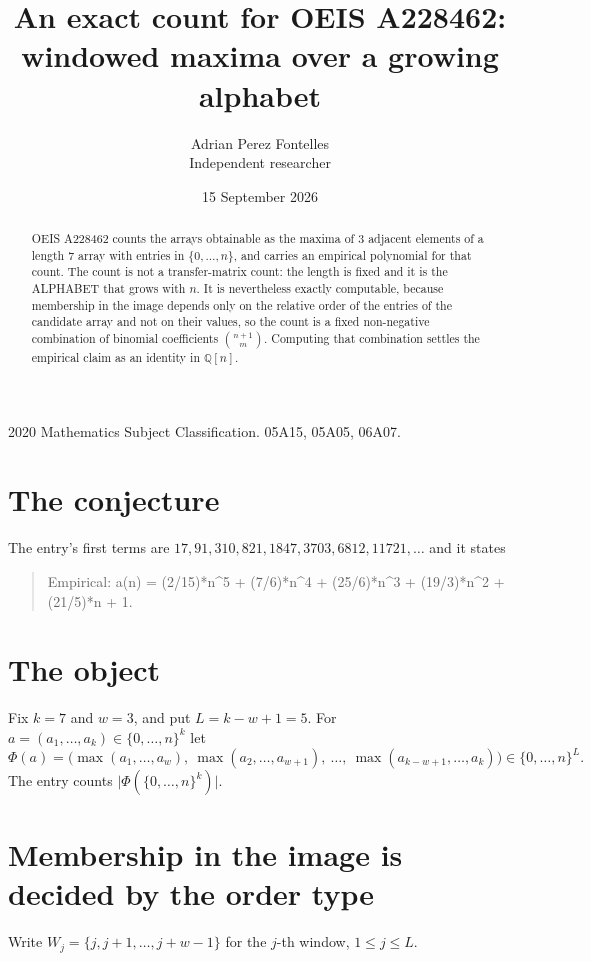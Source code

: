 \documentclass[11pt,a4paper]{article}
\title{An exact count for OEIS A228462: windowed maxima over a growing alphabet}
\author{Adrian Perez Fontelles\\ \small Independent researcher}
\date{15 September 2026}
\theoremstyle{plain}
\theoremstyle{definition}
\begin{document}
\maketitle

\begin{abstract}
OEIS A228462 counts the arrays obtainable as the maxima of $3$ adjacent elements of a length
$7$ array with entries in $\{0,\dots,n\}$, and carries an empirical polynomial for that
count. The count is not a transfer-matrix count: the length is fixed and it is the ALPHABET
that grows with $n$. It is nevertheless exactly computable, because membership in the image
depends only on the relative order of the entries of the candidate array and not on their
values, so the count is a fixed non-negative combination of binomial coefficients
$\binom{n+1}{m}$. Computing that combination settles the empirical claim as an identity in
$\mathbb{Q}[n]$.
\end{abstract}

\noindent\small 2020 Mathematics Subject Classification. 05A15, 05A05, 06A07.\normalsize

\section{The conjecture}

The entry's first terms are $17, 91, 310, 821, 1847, 3703, 6812, 11721,\dots$ and it states

\begin{quote}\raggedright Empirical: a(n) = (2/15)*n\^{}5 + (7/6)*n\^{}4 + (25/6)*n\^{}3 + (19/3)*n\^{}2 + (21/5)*n + 1.\end{quote}

\section{The object}

Fix $k=7$ and $w=3$, and put $L=k-w+1=5$. For $a=(a_1,\dots,a_k)\in\{0,\dots,n\}^k$
let
\[
  \Phi(a)=\bigl(\max(a_1,\dots,a_w),\ \max(a_2,\dots,a_{w+1}),\ \dots,\
  \max(a_{k-w+1},\dots,a_k)\bigr)\in\{0,\dots,n\}^{L} .
\]
The entry counts $\lvert\Phi(\{0,\dots,n\}^k)\rvert$.

\section{Membership in the image is decided by the order type}

Write $W_j=\{j,j+1,\dots,j+w-1\}$ for the $j$-th window, $1\le j\le L$.
\end{document}

